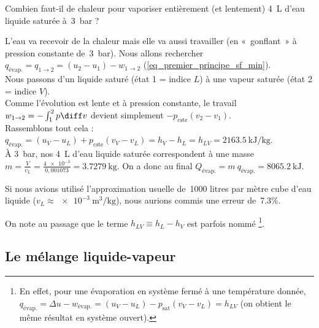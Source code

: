 			\begin{anexample}
			
			Combien faut-il de chaleur pour vaporiser entièrement (et lentement) \SI{4}{\liter} d’eau liquide saturée à~\SI{3}{\bar} ?
			
				\begin{answer}
					L’eau va recevoir de la chaleur mais elle va aussi travailler (en «~gonflant~» à pression constante de~\SI{3}{\bar}). Nous allons rechercher $q_\text{évap.} = q_{1 \to 2} = (u_2 - u_1) - w_{1 \to 2}$ (\ref{eq_premier_principe_sf_min}).\\
					Nous passons d’un liquide saturé (état 1 = indice $L$) à une vapeur saturée (état 2 = indice $V$).\\
					Comme l’évolution est lente et à pression constante, le travail $w_{1 \to 2} = -\int_1^2 p \diff v$ devient simplement $-p_\text{cste} (v_2 - v_1) $.\\
					Rassemblons tout cela : $q_\text{évap.} = (u_V - u_L) + p_\text{cste} (v_V - v_L) = h_V - h_L = h_{LV} = \SI{2163,5}{\kilo\joule\per\kilogram}$.\\
					À \SI{3}{\bar}, nos \SI{4}{\liter} d’eau liquide saturée correspondent à une masse $m = \frac{V}{v_L} = \frac{\num{4e-3}}{0,001073} = \SI{3,7279}{\kilogram} $. On a donc au final $Q_\text{évap.} = m \ q_\text{évap.} = \SI{8065,2}{\kilo\joule}$.
				\begin{remark}Si nous avions utilisé l’approximation usuelle de~\num{1000} litres par mètre cube d’eau liquide ($v_L \approx \SI{e-3}{\metre\cubed\per\kilogram}$), nous aurions commis une erreur de~\num{+7,3}\%.\end{remark}\end{answer}
			\end{anexample}

		\onlyamphibook{\clearpage}%
		On note au passage que le terme $h_{LV} \equiv h_L - h_V$ est parfois nommé \footnote{En effet, pour une évaporation en système fermé à une température donnée, $q_\text{évap.} = \Delta u - w_\text{évap.} = (u_V - u_L) - p_\text{sat} (v_V - v_L) = h_{LV} $ (on obtient le même résultat en système ouvert).}\nolinebreak.




	\subsection{Le mélange liquide-vapeur}
	\label{ch_melange_liquide_vapeur}
	
